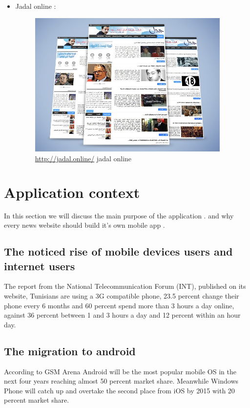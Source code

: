 \begin{itemize}
\item Jadal online  : 
\begin{figure}[H]
	\includegraphics[width=10cm]{jadal.jpg}
	\caption{\href{http://jadal.online/}{http://jadal.online/}  jadal online}
	\label{istic website}
\end{figure}


\end{itemize}


\newpage
\section{Application context}
In this section we will discuss the main purpose of the application . and why every news website should build it's own mobile app . 
\subsection{The noticed rise of mobile devices users and internet users }
The report from the National Telecommunication Forum (INT), published on its website, Tunisians are using a 3G compatible phone, 23.5 percent change their phone every 6 months and 60 percent spend more than 3 hours a day online, against 36 percent between 1 and 3 hours a day and 12 percent within an hour  day.

\subsection{The migration to android }
According to GSM Arena Android will be the most popular mobile OS in the next four years reaching almost 50 percent market share. Meanwhile Windows Phone will catch up and overtake the second place from iOS by 2015 with 20 percent market share.
